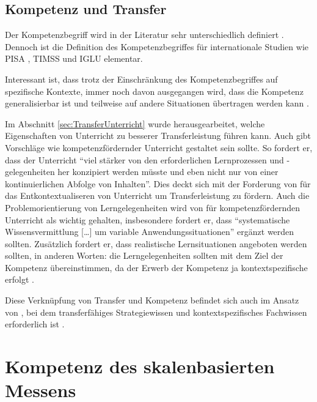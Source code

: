 \subsection{Kompetenz und Transfer}
Der Kompetenzbegriff wird in der Literatur sehr unterschiedlich definiert \citep{Klieme2004, Weinert2001b}. Dennoch ist die Definition des Kompetenzbegriffes für internationale Studien wie PISA \citep{PISA-KonsortiumDeuschland2004}, TIMSS \citep{Martin2003} und IGLU \citep{Bos2003} elementar.


Interessant ist, dass trotz der Einschränkung des Kompetenzbegriffes auf spezifische Kontexte, immer noch davon ausgegangen wird, dass die Kompetenz generalisierbar ist und teilweise auf andere Situationen übertragen werden kann \citep{Hartig2006}.

Im Abschnitt \ref{sec:TransferUnterricht} wurde herausgearbeitet, welche Eigenschaften von Unterricht zu besserer Transferleistung führen kann. Auch \citet{Lersch2007} gibt Vorschläge wie kompetenzfördernder Unterricht gestaltet sein sollte. So fordert er, dass der Unterricht "`viel stärker von den erforderlichen Lernprozessen und -gelegenheiten her konzipiert werden müsste und eben nicht nur von einer kontinuierlichen Abfolge von Inhalten"'. Dies deckt sich mit der Forderung von \citet{Mietzel2007} für das Entkontextualiseren von Unterricht um Transferleistung zu fördern. Auch die Problemorientierung von Lerngelegenheiten wird von \citet{Lersch2007} für kompetenzfördernden Unterricht als wichtig gehalten, insbesondere fordert er, dass "`systematische Wissensvermittlung […] um variable Anwendungssituationen"' ergänzt werden sollten. Zusätzlich fordert er, dass realistische Lernsituationen angeboten werden sollten, in anderen Worten: die Lerngelegenheiten sollten mit dem Ziel der Kompetenz übereinstimmen, da der Erwerb der Kompetenz ja kontextspezifische erfolgt \citep{Klieme2004}.

Diese Verknüpfung von Transfer und Kompetenz befindet sich auch im Ansatz von \citet{Gott2002}, bei dem transferfähiges Strategiewissen und kontextspezifisches Fachwissen erforderlich ist \citep{Gott1996}. 



\section{Kompetenz des skalenbasierten Messens}

